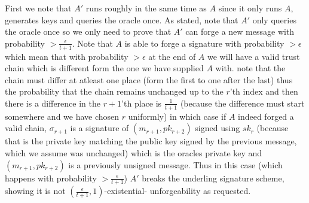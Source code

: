 \documentclass{article}
\begin{document}
First we note that $A'$ runs roughly in the same time as $A$ since it only runs $A$, generates keys and queries the oracle once.
As stated, note that $A'$ only queries the oracle once so we only need to prove that $A'$ can forge a new message with probability $>\frac{\epsilon}{t+1}$.
Note that $A$ is able to forge a signature with probability $> \epsilon$ which mean that with probability $>\epsilon$ at the end of $A$ we will have a valid trust chain which is different form the one we have supplied $A$ with. note that the chain must differ at atleast one place (form the first to one after the last) thus the probability that the chain remains unchanged up to the $r$'th index and then there is a difference in the $r+1$'th place is $\frac{1}{t+1}$ (because the difference must start somewhere and we have chosen $r$ uniformly) in which case if $A$ indeed forged a valid chain, $\sigma_{r+1}$ is a signature of $(m_{r+1}, pk_{r+2})$ signed using $sk_r$ (because that is the private key matching the public key signed by the previous message, which we assume was unchanged) which is the oracles private key and $(m_{r+1}, pk_{r+2})$ is a previously unsigned message. Thus in this case (which happens with probability $>\frac{\epsilon}{t+1}$) $A'$ breaks the underling signature scheme, showing it is not $(\frac{\epsilon}{t+1}, 1)$-existential- unforgeability  as requested.

\section{}%
\subsection{}%

\subsection{}%

\section{}%

\section{}%
\subsection{}%

\subsection{}%
\end{document}
